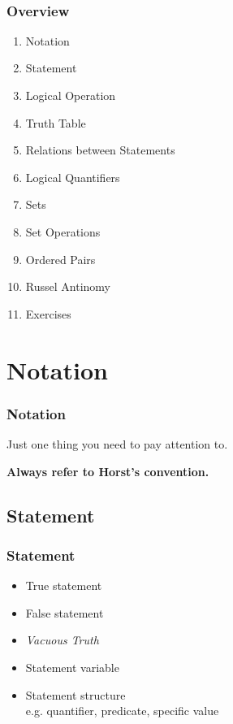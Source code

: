 \documentclass[12pt, t]{beamer}
\renewcommand{\emph}[1]{{\color{Turquoise3}\textsl{#1}}}
\begin{document}
\begin{frame}
    \
    \frametitle{Overview}
    \begin{enumerate}
        \item Notation
        \item Statement
        \item Logical Operation
        \item Truth Table
        \item Relations between Statements
        \item Logical Quantifiers
        \item Sets
        \item Set Operations
        \item Ordered Pairs
        \item Russel Antinomy
        \item Exercises
    \end{enumerate}
\end{frame}

\section{Notation}
\begin{frame}
    \frametitle{Notation}
    Just one thing you need to pay attention to.\\
    
    \begin{center}
        \textbf{Always refer to Horst's convention.}
    \end{center}
    
\end{frame}

\subsection{Statement}
\begin{frame}
    \frametitle{Statement}
    \begin{itemize}
        \item True statement
        \item False statement
        \item \emph{Vacuous Truth}
        \item Statement variable
        \item Statement structure \\
            e.g. quantifier, predicate, specific value
    \end{itemize}
\end{frame}
\end{document}

